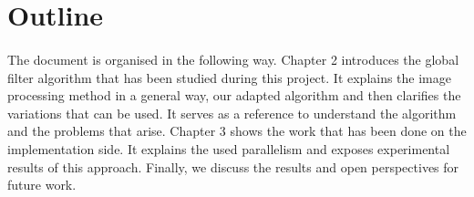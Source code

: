 \section{Outline}

\paragraph{}
The document is organised in the following way.
Chapter 2 introduces the global filter algorithm that has been studied during this project.
It explains the image processing method in a general way, our adapted algorithm and then clarifies the variations that can be used.
It serves as a reference to understand the algorithm and the problems that arise.
Chapter 3 shows the work that has been done on the implementation side.
It explains the used parallelism and exposes experimental results of this approach.
Finally, we discuss the results and open perspectives for future work.
